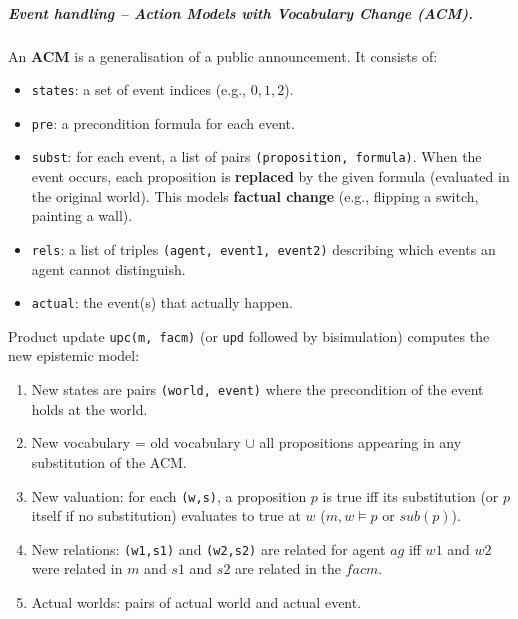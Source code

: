 \subparagraph*{Event handling – Action Models with Vocabulary Change (ACM).}

An \textbf{ACM} is a generalisation of a public announcement. It consists of:
\begin{itemize}
    \item \texttt{states}: a set of event indices (e.g., $0,1,2$).
    \item \texttt{pre}: a precondition formula for each event.
    \item \texttt{subst}: for each event, a list of pairs 
    \texttt{(proposition, formula)}. When the event occurs, 
    each proposition is \textbf{replaced} by the given formula 
    (evaluated in the original world). This models \textbf{factual change} 
    (e.g., flipping a switch, painting a wall).
    \item \texttt{rels}: a list of triples \texttt{(agent, event1, event2)} 
    describing which events an agent cannot distinguish.
    \item \texttt{actual}: the event(s) that actually happen.
\end{itemize}
Product update \texttt{upc(m, facm)} (or \texttt{upd} 
followed by bisimulation) computes the new epistemic model:
\begin{enumerate}
    \item New states are pairs \texttt{(world, event)} 
    where the precondition of the event holds at the world.
    \item New vocabulary = old vocabulary $\cup$ all 
    propositions appearing in any substitution of the ACM.
    \item New valuation: for each \texttt{(w,s)}, a 
    proposition $p$ is true iff its substitution 
    (or $p$ itself if no substitution) evaluates to true 
    at $w$ ($m,w \models p \text{ or }sub(p)$).
    \item New relations: \texttt{(w1,s1)} and 
    \texttt{(w2,s2)} are related for agent $ag$ iff 
    $w1$ and $w2$ were related in $m$ and 
    $s1$ and $s2$ are related in the $facm$.
    \item Actual worlds: pairs of actual world and actual event.
\end{enumerate}

